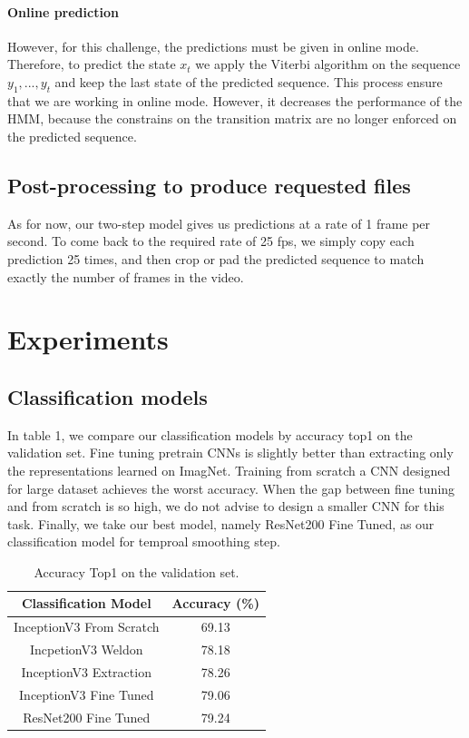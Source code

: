 \documentclass[10pt,twocolumn,letterpaper]{article}
\begin{document}
\paragraph{Online prediction} However, for this challenge, the predictions must
be given in online mode. Therefore, to predict the state
$x_t$ we apply the Viterbi algorithm on the sequence $y_1,...,y_t$ and keep the
last state of the predicted sequence. This process ensure that we are working in online
mode. However, it decreases the performance of the HMM, because the constrains on the transition
matrix are no longer enforced on the predicted sequence.

\subsection{Post-processing to produce requested files}

As for now, our two-step model gives us predictions at a rate of 1 frame per second. To come
back to the required rate of 25 fps, we simply copy each prediction 25 times, and
then crop or pad the predicted sequence to match exactly the number of frames in
the video.

\section{Experiments}

\subsection{Classification models}

In table 1, we compare our classification models by accuracy top1 on the validation set. Fine tuning pretrain CNNs is slightly better than extracting only the representations learned on ImagNet. Training from scratch a CNN designed for large dataset achieves the worst accuracy. When the gap between fine tuning and from scratch is so high, we do not advise to design a smaller CNN for this task. Finally, we take our best model, namely ResNet200 Fine Tuned, as our classification model for temproal smoothing step.

\begin{table}
	\begin{center}
		\begin{tabular}{|c|c|}
			\hline
			Classification Model & Accuracy (\%) \\
			\hline\hline
			InceptionV3 From Scratch & 69.13 \\
			IncpetionV3 Weldon & 78.18 \\
			InceptionV3 Extraction & 78.26 \\
			InceptionV3 Fine Tuned & 79.06 \\
			ResNet200 Fine Tuned & 79.24 \\
			\hline
		\end{tabular}
	\end{center}
	\caption{Accuracy Top1 on the validation set.}
\end{table}
\end{document}
